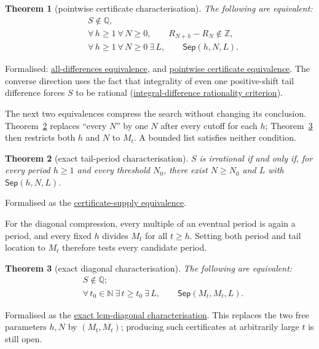 \documentclass[11pt]{article}
\newcommand{\commit}{312b96c0d149ed466725c62d4ef24cfc91bca34e}
\newcommand{\repobase}{https://github.com/wcook04/plectis-lean-erdos249-257/blob/\commit}
\newcommand{\PK}{Erdos249257}
\newcommand{\lword}[4]{\href{\repobase/\PK/#1\#L#2}{#4}}
\newtheorem{theorem}{Theorem}[section]
\theoremstyle{definition}
\theoremstyle{remark}
\newcommand{\N}{\mathbb{N}}
\newcommand{\Z}{\mathbb{Z}}
\newcommand{\Q}{\mathbb{Q}}
\begin{document}
\begin{theorem}[pointwise certificate characterisation]
\label{res:pointwisecomplete}
The following are equivalent:
\[
\begin{aligned}
 &S\notin\Q,\\
 &\forall\,h\ge1\ \forall\,N\ge0,\qquad R_{N+h}-R_N\notin\Z,\\
 &\forall\,h\ge1\ \forall\,N\ge0\ \exists\,L,\qquad
      \mathsf{Sep}(h,N,L).
\end{aligned}
\]
\end{theorem}
\noindent Formalised:
\lword{LcmConeFlatness.lean}{386}{irrational_totient_series_iff_all_tail_diffs_nonintegral}{all-differences equivalence},
and
\lword{LcmConeFlatness.lean}{399}{irrational_totient_series_iff_pointwise_certificates}{pointwise certificate equivalence}.
The converse direction uses the fact that integrality of even one
positive-shift tail difference forces $S$ to be rational
(\lword{LcmConeFlatness.lean}{357}{not_irrational_of_tail_diff_mem_int}{integral-difference rationality criterion}).

The next two equivalences compress the search without changing its conclusion.
Theorem~\ref{res:red21} replaces ``every \(N\)'' by one \(N\) after every
cutoff for each \(h\); Theorem~\ref{res:diag} then restricts both \(h\) and
\(N\) to \(M_t\).  A bounded list satisfies neither condition.

\begin{theorem}[exact tail-period characterisation]\label{res:red21}
$S$ is irrational if and only if, for every period $h\ge1$ and every threshold
$N_0$, there exist $N\ge N_0$ and $L$ with $\mathsf{Sep}(h,N,L)$.
\end{theorem}
\noindent Formalised as the
\lword{LcmConeFlatness.lean}{412}{irrational_totient_series_iff_certificate_supply}{certificate-supply equivalence}.

For the diagonal compression, every multiple of an eventual period is again
a period, and every fixed \(h\) divides \(M_t\) for all \(t\geq h\).  Setting
both period and tail location to \(M_t\) therefore tests every candidate period.

\begin{theorem}[exact diagonal characterisation]\label{res:diag}
The following are equivalent:
\[
\begin{aligned}
 &S\notin\Q;\\
 &\forall\,t_0\in\N\ \exists\,t\geq t_0\ \exists\,L,\qquad
   \mathsf{Sep}(M_t,M_t,L).
\end{aligned}
\]
\end{theorem}
\noindent Formalised as the
\lword{LcmConeFlatness.lean}{426}{irrational_totient_series_iff_lcm_diagonal_certificate_supply}{exact lcm-diagonal characterisation}.
This replaces the two free parameters \(h,N\) by \((M_t,M_t)\);
producing such certificates at arbitrarily large \(t\) is still open.
\end{document}

